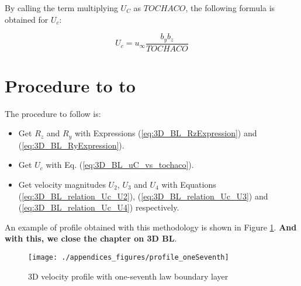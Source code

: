 By calling the term multiplying $U_C$ as $TOCHACO$, the following formula is obtained for $U_c$:

\begin{equation}
\label{eq:3D_BL_uC_vs_tochaco}
\boxed{
U_c = u_\infty \frac{b_y b_z}{TOCHACO}
}
\end{equation}


\section{Procedure to to }

The procedure to follow is:

\begin{itemize}

	\item Get $R_z$ and $R_y$ with Expressions (\ref{eq:3D_BL_RzExpression}) and (\ref{eq:3D_BL_RyExpression}).
	
	\item Get $U_c$ with Eq. (\ref{eq:3D_BL_uC_vs_tochaco}).
	
	\item Get velocity magnitudes $U_2$, $U_3$ and $U_4$ with Equations (\ref{eq:3D_BL_relation_Uc_U2}), (\ref{eq:3D_BL_relation_Uc_U3}) and  (\ref{eq:3D_BL_relation_Uc_U4}) respectively.

\end{itemize}

An example of profile obtained with this methodology is shown in Figure \ref{fig:3D_BL_oneSeventh}. \textbf{And with this, we close the chapter on 3D BL}.

\begin{figure}[h!]
	\centering
	\texttt{[image: ./appendices\_figures/profile\_oneSeventh]}
	\caption{3D velocity profile with one-seventh law boundary layer}
	\label{fig:3D_BL_oneSeventh}
\end{figure}